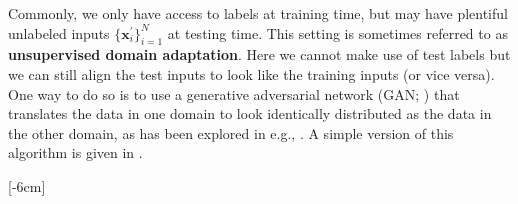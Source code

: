Commonly, we only have access to labels at training time, but may have plentiful unlabeled inputs $\{\mathbf{x}^{\prime}_i\}_{i=1}^N$ at testing time. This setting is sometimes referred to as \textbf{unsupervised domain adaptation}. Here we cannot make use of test labels but we can still align the test inputs to look like the training inputs (or vice versa). One way to do so is to use a generative adversarial network (GAN; \chap{\ref{chapter:generative_models}}) that translates the data in one domain to look identically distributed as the data in the other domain, as has been explored in e.g., \cite{tzeng2017adversarial,CycleGAN2017,hoffman2018cycada}. A simple version of this algorithm is given in \algref{\ref{alg:transfer_learning:domain_adaptation_by_translation}}.


[-6cm]


